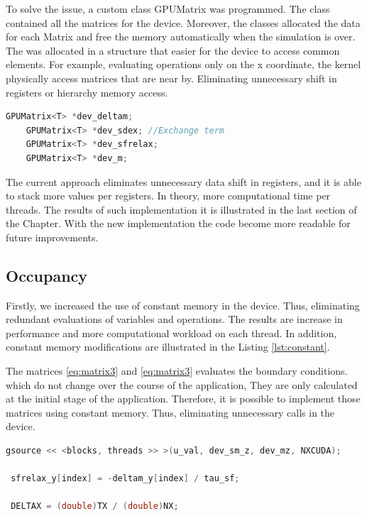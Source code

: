 To solve the issue, a custom class GPUMatrix was programmed. The class contained all the matrices for the device. Moreover, the classes allocated the data for each Matrix and free the memory automatically when the simulation is over. The was allocated in a structure that easier for the device to access common elements. For example, evaluating operations only on the x coordinate, the kernel physically access matrices that are near by. Eliminating unnecessary shift in registers or hierarchy memory access.

\begin{lstlisting}[language=C++, label={lst:sao}, caption={SOA implementation}]
    GPUMatrix<T> *dev_deltam;
    GPUMatrix<T> *dev_sdex; //Exchange term
    GPUMatrix<T> *dev_sfrelax;
    GPUMatrix<T> *dev_m; 
\end{lstlisting}

The current approach eliminates unnecessary data shift in registers, and it is able to stack more values per registers. In theory, more computational time per threads. The results of such implementation it is illustrated in the last section of the Chapter. With the new implementation the code become more readable for future improvements. 

\subsection{Occupancy}
 
Firstly, we increased the use of constant memory in the device. Thus, eliminating redundant evaluations of variables and operations. The results are increase in performance and more computational workload on each thread. In addition, constant memory modifications are illustrated in the Listing \ref{lst:constant}. 

The matrices \ref{eq:matrix3} and \ref{eq:matrix3} evaluates the boundary conditions. which do not change over the course of the application, They are only calculated at the initial stage of the application. Therefore, it is possible to implement those matrices using constant memory. Thus, eliminating unnecessary calls in the device.
 
 \begin{lstlisting}[language=C++,  label={lst:constant}, caption={Constant Memory changes}]
 gsource << <blocks, threads >> >(u_val, dev_sm_z, dev_mz, NXCUDA);
 
 sfrelax_y[index] = -deltam_y[index] / tau_sf;
     
 DELTAX = (double)TX / (double)NX;
\end{lstlisting}
 

